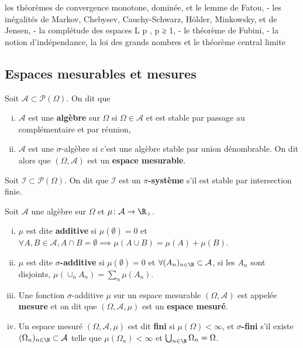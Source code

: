 les théorèmes de convergence monotone, dominée, et le lemme de Fatou,
- les inégalités de Markov, Chebysev, Cauchy-Schwarz, Hölder, Minkowsky, et
de Jensen,
- la complétude des espaces L p , p ≥ 1,
- le théorème de Fubini,
- la notion d’indépendance, la loi des grands nombres et le théorème central
limite


\subsection{Espaces mesurables et mesures}

	\begin{defn}
		Soit $\mathcal{A} \subset \mathcal{P}(\Omega)$.
		On dit que
		\begin{enumerate}[(i)]
			\item $\mathcal{A}$ est une \textbf{algèbre} sur $\Omega$ si $\Omega \in \mathcal{A}$ et est stable par passage au complémentaire et par réunion,
			\item $\mathcal{A}$ est une $\sigma$-algèbre si c'est une algèbre stable par union dénombrable.
				On dit alors que $(\Omega,\mathcal{A})$ est un \textbf{espace mesurable}.
		\end{enumerate}
	\end{defn}

	\begin{defn}
		Soit $\mathcal{I} \subset \mathcal{P}(\Omega)$.
		On dit que $\mathcal{I}$ est un \textbf{$\pi$-système} s'il est stable par intersection finie.
	\end{defn}

	\begin{defn}
		Soit $\mathcal{A}$ une algèbre sur $\Omega$ et $\mu \colon \mathcal{A} \to \R_+$.
		\begin{enumerate}[(i)]
			\item $\mu$ est dite \textbf{additive} si $\mu(\emptyset) = 0$ et $\forall A,B \in \mathcal{A}, A \cap B = \emptyset \implies \mu(A \cup B) = \mu(A) + \mu(B)$.
			\item $\mu$ est dite \textbf{$\sigma$-additive} si $\mu(\emptyset) = 0$ et $\forall (A_n)_{n \in \N} \subset \mathcal{A}$, si les $A_n$ sont disjoints, $\mu(\cup_n A_n) = \sum_n \mu(A_n)$.
			\item Une fonction $\sigma$-additive $\mu$ sur un espace mesurable $(\Omega,\mathcal{A})$ est appelée \textbf{mesure} et on dit que $(\Omega,\mathcal{A},\mu)$ est un \textbf{espace mesuré}.
			\item Un espace mesuré $(\Omega,\mathcal{A},\mu)$ est dit \textbf{fini} si $\mu(\Omega) < \infty$, et \textbf{$\sigma$-fini} s'il existe $(\Omega_n)_{n \in \N} \subset \mathcal{A}$ telle que $\mu(\Omega_n) < \infty$ et $\bigcup_{n \in \N} \Omega_n = \Omega$.
		\end{enumerate}
	\end{defn}

